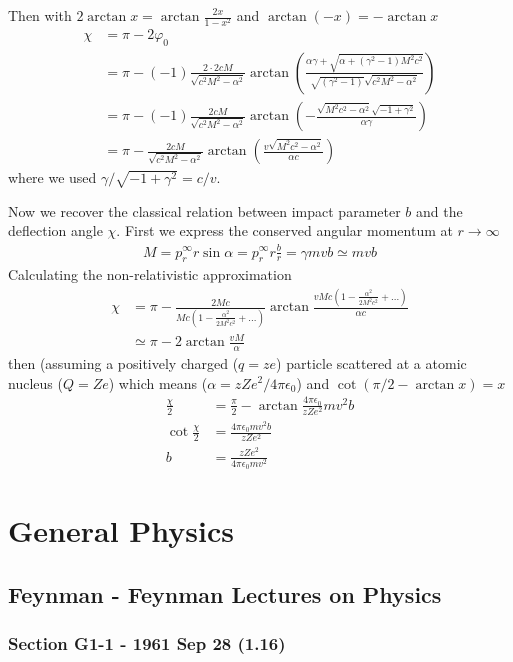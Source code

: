 \documentclass[10pt,a4paper]{book}
\theoremstyle{definition}
\begin{document}
Then with $2\arctan x =\arctan\frac{2x}{1-x^2}$ and $\arctan(-x)=-\arctan x$
\begin{align}
\chi&=\pi-2\varphi_0\\
&=\pi-(-1)\frac{2\cdot2 c M}{\sqrt{c^2 M^2-\alpha ^2}} \arctan\left(\frac{\alpha  \gamma + \sqrt{\alpha
+\left(\gamma ^2-1\right) M^2c^2}}{\sqrt{ \left(\gamma^2-1\right)} \sqrt{c^2 M^2-\alpha ^2}}\right)\\
&=\pi-(-1)\frac{2 c M}{\sqrt{c^2 M^2-\alpha ^2}} \arctan\left(-\frac{\sqrt{M^2c^2-\alpha^2}\sqrt{-1+\gamma^2}}{\alpha\gamma}\right)\\
&=\pi-\frac{2 c M}{\sqrt{c^2 M^2-\alpha ^2}} \arctan\left(\frac{v\sqrt{M^2c^2-\alpha^2}}{\alpha c}\right)
\end{align}
where we used $\gamma/\sqrt{-1+\gamma^2}=c/v$.

Now we recover the classical relation between impact parameter $b$ and the deflection angle $\chi$. First we express the conserved angular momentum at $r\rightarrow\infty$
\begin{align}
M=p_r^\infty r \sin\alpha=p_r^\infty r\frac{b}{r}=\gamma m vb\simeq mvb
\end{align}
Calculating the non-relativistic approximation
\begin{align}
\chi
&=\pi-\frac{2Mc}{Mc\left(1-\frac{\alpha^2}{2M^2c^2}+...\right)}\arctan\frac{vMc\left(1-\frac{\alpha^2}{2M^2c^2}+...\right)}{\alpha c}\\
&\simeq\pi-2\arctan\frac{vM}{\alpha}
\end{align}
then (assuming a positively charged ($q=ze$) particle scattered at a atomic nucleus ($Q=Ze$) which means ($\alpha=zZe^2/4\pi\epsilon_0$) and $\cot\left(\pi/2-\arctan x\right)=x$
\begin{align}
\frac{\chi}{2}&=\frac{\pi}{2}-\arctan \frac{4\pi\epsilon_0}{zZe^2}mv^2b\\
\cot\frac{\chi}{2}&=\frac{4\pi\epsilon_0mv^2b}{zZe^2}\\
b&=\frac{zZe^2}{4\pi\epsilon_0mv^2}
\end{align}

\chapter{General Physics}

\section{{\sc Feynman} - Feynman Lectures on Physics}
\subsection{Section G1-1 - 1961 Sep 28 (1.16)}
\end{document}
